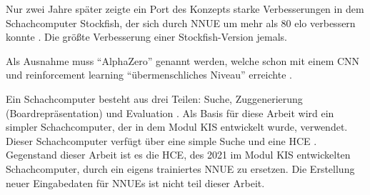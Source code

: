 Nur zwei Jahre später zeigte ein Port des Konzepts starke Verbesserungen in dem Schachcomputer Stockfish, der sich durch \ac{NNUE} um mehr als 80 elo verbessern konnte \cite{StockfishIntroducingNNUE}. Die größte Verbesserung einer Stockfish-Version jemals.

Als Ausnahme muss \enquote{AlphaZero} genannt werden, welche schon \citeyear{Silver2017} mit einem \ac{CNN} und reinforcement learning \enquote{übermenschliches Niveau} erreichte \cite{Silver2017}.


Ein Schachcomputer besteht aus drei Teilen: Suche, Zuggenerierung (Boardrepräsentation) und Evaluation \cite{VazquezFernandez2013}. Als Basis für diese Arbeit wird ein simpler Schachcomputer, der in dem Modul \ac{KIS} entwickelt wurde, verwendet. Dieser Schachcomputer verfügt über eine simple Suche und eine \ac{HCE} \cite{nopy}. Gegenstand dieser Arbeit ist es die \ac{HCE}, des 2021 im Modul \ac{KIS} entwickelten Schachcomputer, durch ein eigens trainiertes \ac{NNUE} zu ersetzen. Die Erstellung neuer Eingabedaten für \acp{NNUE} ist nicht teil dieser Arbeit.